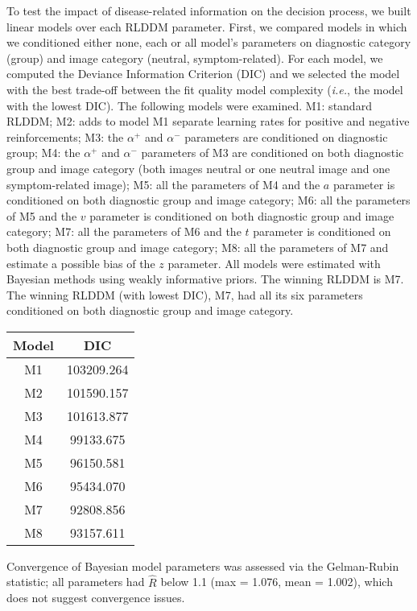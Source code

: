 \documentclass[
  man,floatsintext]{apa6}
\begin{document}
To test the impact of disease-related information on the decision process, we built linear models over each RLDDM parameter. First, we compared models in which we conditioned either none, each or all model's parameters on diagnostic category (group) and image category (neutral, symptom-related). For each model, we computed the Deviance Information Criterion (DIC) and we selected the model with the best trade-off between the fit quality model complexity (\emph{i.e.}, the model with the lowest DIC). The following models were examined. M1: standard RLDDM; M2: adds to model M1 separate learning rates for positive and negative reinforcements; M3: the \(\alpha^+\) and \(\alpha^-\) parameters are conditioned on diagnostic group; M4: the \(\alpha^+\) and \(\alpha^-\) parameters of M3 are conditioned on both diagnostic group and image category (both images neutral or one neutral image and one symptom-related image); M5: all the parameters of M4 and the \(a\) parameter is conditioned on both diagnostic group and image category; M6: all the parameters of M5 and the \(v\) parameter is conditioned on both diagnostic group and image category; M7: all the parameters of M6 and the \(t\) parameter is conditioned on both diagnostic group and image category; M8: all the parameters of M7 and estimate a possible bias of the \(z\) parameter. All models were estimated with Bayesian methods using weakly informative priors. The winning RLDDM is M7. The winning RLDDM (with lowest DIC), M7, had all its six parameters conditioned on both diagnostic group and image category.

\begin{longtable}[]{@{}cc@{}}
\toprule()
Model & DIC \\
\midrule()
\endhead
M1 & 103209.264 \\
M2 & 101590.157 \\
M3 & 101613.877 \\
M4 & 99133.675 \\
M5 & 96150.581 \\
M6 & 95434.070 \\
M7 & 92808.856 \\
M8 & 93157.611 \\
\bottomrule()
\end{longtable}

Convergence of Bayesian model parameters was assessed via the Gelman-Rubin statistic; all parameters had \(\hat{R}\) below 1.1 (max = 1.076, mean = 1.002), which does not suggest convergence issues.
\end{document}
